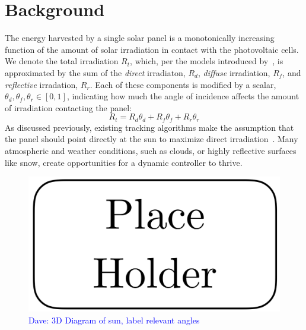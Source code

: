 \documentclass[11pt]{article}
\newcommand{\dnote}[1]{\textcolor{blue}{Dave: #1}}
\begin{document}
\section{Background}

The energy harvested by a single solar panel is a monotonically increasing function of the amount of solar irradiation in contact with the photovoltaic cells. We denote the total irradiation $R_t$, which, per the models introduced by~\citet{kamali2006estimating}, is approximated by the sum of the {\it direct} irradiaton, $R_d$, {\it diffuse} irradiation, $R_f$, and {\it reflective} irradation, $R_r$. Each of these components is modified by a scalar, $\theta_d, \theta_f, \theta_r \in [0,1]$, indicating how much the angle of incidence affects the amount of irradiation contacting the panel:
\begin{equation}
R_t = R_d \theta_d + R_f \theta_f + R_r \theta_r
\label{eq:eq:total_rads}
\end{equation}
As discussed previously, existing tracking algorithms make the assumption that the panel should point directly at the sun to maximize direct irradiation~\cite{Grena2008,Grena2012,reda2004solar}. Many atmospheric and weather conditions, such as clouds, or highly reflective surfaces like snow, create opportunities for a dynamic controller to thrive.


\begin{figure}
\begin{center}
\includegraphics[scale=0.3]{figures/placeholder.png}
\caption{\dnote{3D Diagram of sun, label relevant angles}}
\end{center}
\end{figure}


\end{document}
